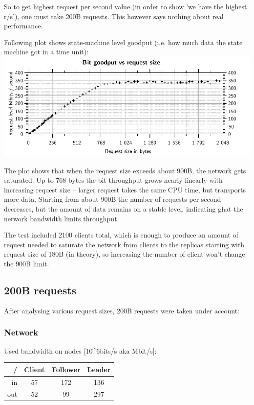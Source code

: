 So to get highest request per second value (in order to show 'we have the highest r/s'), one must take 200B requests.
This however says nothing about real performance.

\medskip

Following plot shows state-machine level goodput (i.e. how much data the state machine got in a time unit):\\
\includegraphics{varia/reqSize_mbps.pdf}

The plot shows that when the request size exceeds about 900B, the network gets saturated. 
Up to 768 bytes the bit throughput grows nearly linearly with increasing request size -- larger request takes the same CPU time, but transports more data. Starting from about 900B the number of requests per second decreases, but the amount of data remains on a stable level, indicating ghat the network bandwidth limits throughput.

The test included 2100 clients total, which is enough to produce an amount of request needed to saturate the network from clients to the replicas starting with request size of 180B (in theory), so increasing the number of client won't change the 
900B limit.


\subsection{200B requests}

After analysing various request sizes, 200B requests were taken under account:

\subsubsection{Network}

Used bandwidth on nodes [10\textasciicircum 6bits/s aka Mbit/s]:\\
\begin{tabular}{|r|c|c|c|}\hline
 /  & Client & Follower & Leader \\ \hline
in  & 57     & 172      & 136    \\ \hline
out & 52     & 99       & 297    \\ \hline
\end{tabular}

